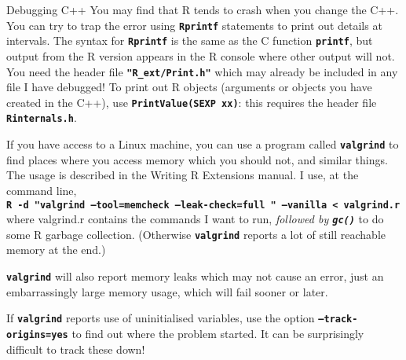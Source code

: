 \documentclass[12pt, a4paper]{article}
\makeatletter
\renewcommand{\=}{\,=\,}
\newcommand{\+}{\,+\,}
\newcommand{\sfn}[1]{\textbf{\texttt{#1}}}
\renewcommand{\section}{\@startsection{section}{1}
                {0pt}{\baselineskip}{0.5\baselineskip}
                {\centering\sffamily} }
\makeatother
\begin{document}
\section{Debugging C++}
You may find that R tends to crash when you change the C++. You can try to trap
the error using \sfn{Rprintf} statements to print out details at intervals. The
syntax for \sfn{Rprintf} is the same as the C function \sfn{printf}, but output
from the R version appears in the R console where other output will not. You
need the header file \sfn{"R\_ext/Print.h"} which may already be
included in any file I have debugged! To print out R objects (arguments or
objects you have created in the C++), use
\sfn{PrintValue(SEXP xx)}: this requires the header file \sfn{Rinternals.h}.

If you have access to a Linux machine, you can use a program called
\sfn{valgrind} to find places where you access memory which you should not, and
similar things. The usage is described in the Writing R Extensions manual. I
use, at the command line,\\
\sfn{R -d "valgrind --tool=memcheck --leak-check=full " --vanilla < valgrind.r}
\\
where valgrind.r contains the commands I want to run, \emph{followed by
  \sfn{gc()}} to do some R garbage collection. (Otherwise \sfn{valgrind} reports
a lot of still reachable memory at the end.)

\sfn{valgrind} will also report memory leaks which may not cause an error, just
an embarrassingly large memory usage, which will fail sooner or later.

If \sfn{valgrind} reports use of uninitialised variables, use the option
\sfn{--track-origins=yes} to find out where the problem started. It can be
surprisingly difficult to track these down!
\end{document}
